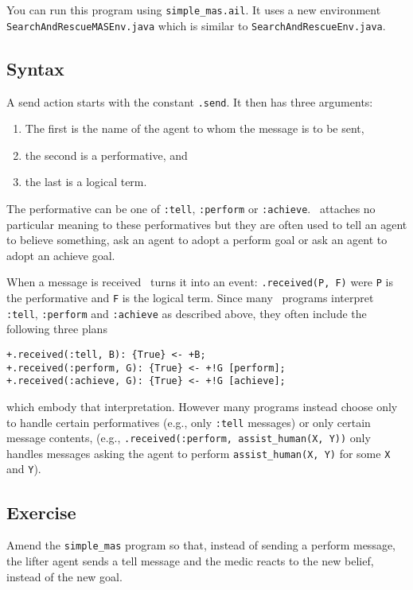 \begin{sloppypar}
You can run this program using \texttt{simple\_mas.ail}.  It uses a new environment \texttt{SearchAndRescueMASEnv.java} which is similar to \texttt{SearchAndRescueEnv.java}.
\end{sloppypar}

\subsection{Syntax}

A send action starts with the constant \texttt{.send}.  It then has three arguments:
\begin{enumerate}
\item The first is the name of the agent to whom the message is to be sent, 
\item the second is a performative, and 
\item the last is a logical term.  
\end{enumerate}
The performative can be one of \texttt{:tell}, \texttt{:perform} or \texttt{:achieve}.  \gwendolen\ attaches no particular meaning to these performatives but they are often used to tell an agent to believe something, ask an agent to adopt a perform goal or ask an agent to adopt an achieve goal.

\begin{sloppypar}
When a message is received \gwendolen\ turns it into an event: \texttt{.received(P,~F)} were \texttt{P} is the performative and \texttt{F} is the logical term.  Since many \gwendolen\ programs interpret \texttt{:tell}, \texttt{:perform} and \texttt{:achieve} as described above, they often include the following three plans 
\end{sloppypar}
\begin{verbatim}
+.received(:tell, B): {True} <- +B;
+.received(:perform, G): {True} <- +!G [perform];
+.received(:achieve, G): {True} <- +!G [achieve];
\end{verbatim}
which embody that interpretation.  However many programs instead choose only to handle certain performatives (e.g., only \texttt{:tell} messages) or only certain message contents, (e.g., \texttt{.received(:perform, assist\_human(X, Y))} only handles messages asking the agent to perform \texttt{assist\_human(X, Y)} for some \texttt{X} and \texttt{Y}).

\subsection{Exercise}
Amend the \texttt{simple\_mas} program so that, instead of sending a perform message, the lifter agent sends a tell message and the medic reacts to the new belief, instead of the new goal.

